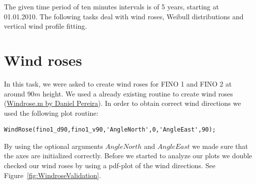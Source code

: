 \documentclass[10pt]{article}
\begin{document}
The given time period of ten minutes intervals is of 5 years, starting at 01.01.2010. The following tasks deal with wind roses, Weibull distributions and vertical wind profile fitting.
\newpage
\section{Wind roses}
In this task, we were asked to create wind roses for FINO 1 and FINO 2 at around $90m$ height. We
used a already existing routine to create wind roses (\href{http://www.mathworks.com/matlabcentral/fileexchange/47248-wind-rose/content/WindRose.m}{Windrose.m by Daniel Pereira}).
In order to obtain correct wind directions we used the following plot routine:\\
\begin{lstlisting}
WindRose(fino1_d90,fino1_v90,'AngleNorth',0,'AngleEast',90);
\end{lstlisting}
By using the optional arguments $AngleNorth$ and $AngleEast$ we made sure that the axes are initialized correctly.
Before we started to analyze our plots we double checked our wind roses by using a pdf-plot of the wind directions. See Figure~\ref{fig:WindroseValidation}.
\end{document}
